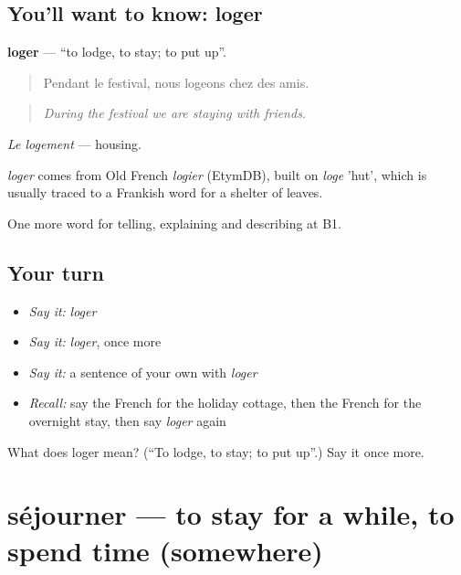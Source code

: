 \subsection*{You'll want to know: loger}
\textbf{loger} — \textquotedblleft{}to lodge, to stay; to put up\textquotedblright{}.

\begin{quote}
Pendant le festival, nous logeons chez des amis.
\end{quote}

\begin{quote}
\emph{During the festival we are staying with friends.}
\end{quote}

\emph{Le logement} — housing.

\begin{cousinweb}
\emph{loger} comes from Old French \emph{logier} (EtymDB), built on \emph{loge} 'hut', which is usually traced to a Frankish word for a shelter of leaves.
\end{cousinweb}

\begin{grammarlens}[title={What you've built}]
One more word for telling, explaining and describing at B1.
\end{grammarlens}

\subsection*{Your turn}
\begin{itemize}
\raggedright
  \item \emph{Say it:} \emph{loger}
  \item \emph{Say it:} \emph{loger}, once more
  \item \emph{Say it:} a sentence of your own with \emph{loger}
  \item \emph{Recall:} say the French for the holiday cottage, then the French for the overnight stay, then say \emph{loger} again
\end{itemize}

\begin{tcolorbox}[breakable,colback=teal!4,colframe=teal!35!black,title={Before you move on}]
What does loger mean? (\textquotedblleft{}To lodge, to stay; to put up\textquotedblright{}.) Say it once more.
\end{tcolorbox}
\section[séjourner]{séjourner — to stay for a while, to spend time (somewhere)}

